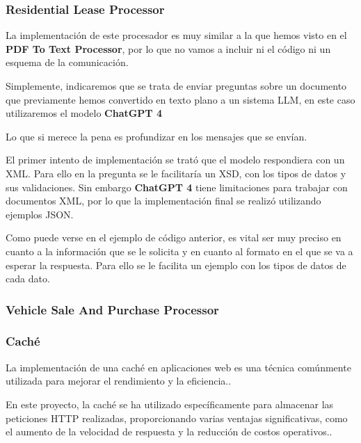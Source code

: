 \subsubsection*{Residential Lease Processor}

La implementación de este procesador es muy similar a la que hemos visto en el \textbf{PDF To Text Processor}, por lo
que no vamos a incluir ni el código ni un esquema de la comunicación.

Simplemente, indicaremos que se trata de enviar preguntas sobre un documento que previamente hemos convertido en texto
plano a un sistema LLM, en este caso utilizaremos el modelo
\textbf{ChatGPT 4}~\cite{https://platform.openai.com/docs/models/gpt-4}

Lo que si merece la pena es profundizar en los mensajes que se envían.

El primer intento de implementación se trató que el modelo respondiera con un XML. Para ello en la pregunta se le
facilitaría un XSD, con los tipos de datos y sus validaciones.
Sin embargo \textbf{ChatGPT 4} tiene limitaciones para trabajar con documentos XML, por lo que la implementación final
se realizó utilizando ejemplos JSON.



Como puede verse en el ejemplo de código anterior, es vital ser muy preciso en cuanto a la información que se le
solicita y en cuanto al formato en el que se va a esperar la respuesta.
Para ello se le facilita un ejemplo con los tipos de datos de cada dato.

\subsubsection*{Vehicle Sale And Purchase Processor}

\subsubsection*{Caché}

La implementación de una caché en aplicaciones web es una técnica comúnmente utilizada para mejorar el rendimiento y la
eficiencia..

En este proyecto, la caché se ha utilizado específicamente para almacenar las peticiones HTTP realizadas, proporcionando
varias ventajas significativas, como el aumento de la velocidad de respuesta y la reducción de costos operativos..

